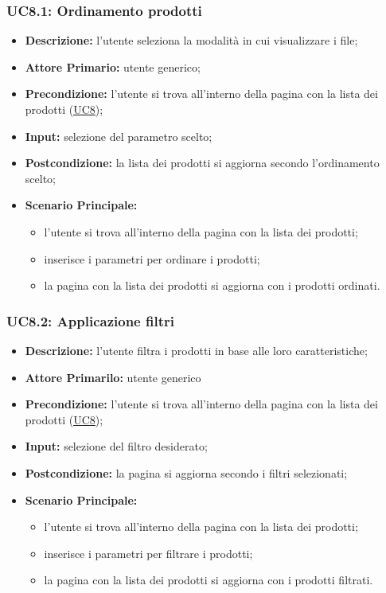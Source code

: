         \subsubsection{UC8.1: Ordinamento prodotti}
        \label{sec:UC8.1}
        \begin{itemize}
            \item \textbf{Descrizione:} l'utente seleziona la modalità in cui visualizzare i file;
            \item \textbf{Attore Primario:} utente generico;
            \item \textbf{Precondizione:} l'utente si trova all'interno della pagina con la lista dei prodotti (\hyperref[sec:UC8]{\underline{UC8}});
            \item \textbf{Input:} selezione del parametro scelto;
            \item \textbf{Postcondizione:} la lista dei prodotti si aggiorna secondo l'ordinamento scelto;
            \item \textbf{Scenario Principale:}
            \begin{itemize}
                \item l'utente si trova all'interno della pagina con la lista dei prodotti;
                \item inserisce i parametri per ordinare i prodotti;
                \item la pagina con la lista dei prodotti si aggiorna con i prodotti ordinati.
            \end{itemize}
        \end{itemize}
        \subsubsection{UC8.2: Applicazione filtri}
        \label{sec:UC8.2}
        \begin{itemize}
            \item \textbf{Descrizione:} l'utente filtra i prodotti in base alle loro caratteristiche;
            \item \textbf{Attore Primarilo:} utente generico
            \item \textbf{Precondizione:} l'utente si trova all'interno della pagina con la lista dei prodotti (\hyperref[sec:UC8]{\underline{UC8}});
            \item \textbf{Input:} selezione del filtro desiderato;
            \item \textbf{Postcondizione:} la pagina si aggiorna secondo i filtri selezionati;
            \item \textbf{Scenario Principale:}
            \begin{itemize}
                \item l'utente si trova all'interno della pagina con la lista dei prodotti;
                \item inserisce i parametri per filtrare i prodotti;
                \item la pagina con la lista dei prodotti si aggiorna con i prodotti filtrati.
            \end{itemize}
        \end{itemize}